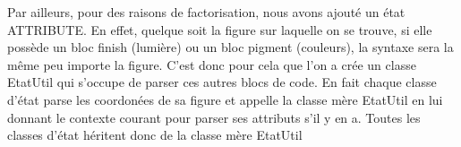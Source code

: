 \documentclass[../../Rapport RayTracer]{subfiles}
\begin{document}
Par ailleurs, pour des raisons de factorisation, nous avons ajouté un état ATTRIBUTE. En effet, quelque soit la figure sur laquelle on se trouve, si elle possède un bloc finish (lumière) ou un bloc pigment (couleurs), la syntaxe sera la même peu importe la figure. C'est donc pour cela que l'on a crée un classe EtatUtil qui s'occupe de parser ces autres blocs de code. En fait chaque classe d'état parse les coordonées de sa figure et appelle la classe mère EtatUtil en lui donnant le contexte courant pour parser ses attributs s'il y en a. Toutes les classes d'état héritent donc de la classe mère EtatUtil
\end{document}
